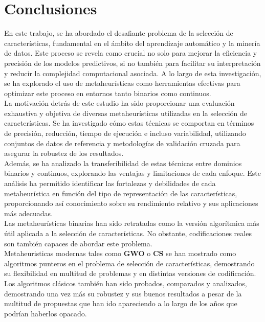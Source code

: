 \chapter{Conclusiones}
En este trabajo, se ha abordado el desafiante problema de la selección de características, fundamental en el ámbito del aprendizaje automático y la minería de datos. Este proceso se revela como crucial no solo para mejorar la eficiencia y precisión de los modelos predictivos, si no también para facilitar su interpretación y reducir la complejidad computacional asociada. A lo largo de esta investigación, se ha explorado el uso de metaheurísticas como herramientas efectivas para optimizar este proceso en entornos tanto binarios como continuos.\\[6pt]
La motivación detrás de este estudio ha sido proporcionar una evaluación exhaustiva y objetiva de diversas metaheurísticas utilizadas en la selección de características. Se ha investigado cómo estas técnicas se comportan en términos de precisión, reducción, tiempo de ejecución e incluso variabilidad, utilizando conjuntos de datos de referencia y metodologías de validación cruzada para asegurar la robustez de los resultados.\\[6pt]
Además, se ha analizado la transferibilidad de estas técnicas entre dominios binarios y continuos, explorando las ventajas y limitaciones de cada enfoque. Este análisis ha permitido identificar las fortalezas y debilidades de cada metaheurística en función del tipo de representación de las características, proporcionando así conocimiento sobre su rendimiento relativo y sus aplicaciones más adecuadas.\\[6pt]
Las metaheurísticas binarias han sido retratadas como la versión algorítmica más útil aplicada a la selección de características. No obstante, codificaciones reales son también capaces de abordar este problema.\\[6pt]
Metaheuristicas modernas tales como \textbf{GWO} o \textbf{CS} se han mostrado como algoritmos punteros en el problema de selección de características, demostrando su flexibilidad en multitud de problemas y en distintas versiones de codificación. Los algoritmos clásicos también han sido probados, comparados y analizados, demostrando una vez más su robustez y sus buenos resultados a pesar de la multitud de propuestas que han ido apareciendo a lo largo de los años que podrían haberlos opacado.\\[6pt]

